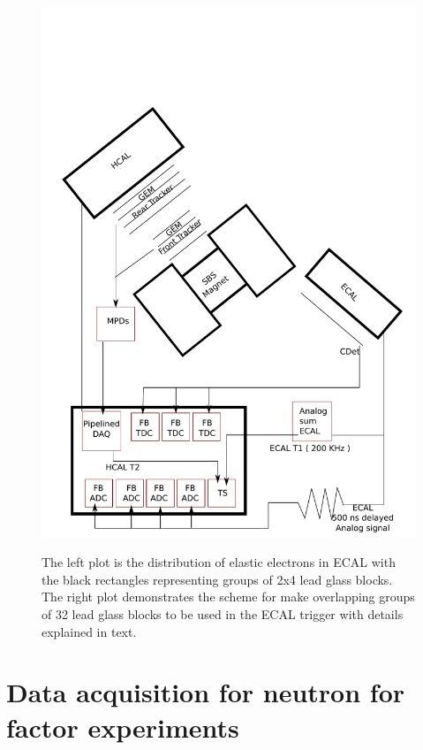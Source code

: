\documentclass{article}
\begin{document}
\begin{figure}
  \centering
  \includegraphics[width=\textwidth]{figs/Gep5layout.pdf}\\
  \caption{The left plot is the distribution of elastic electrons in ECAL with the black rectangles representing
groups of 2x4 lead glass blocks. The right plot demonstrates
the scheme for make overlapping groups of 32 lead glass blocks to be used in the ECAL trigger with
details explained in text.  }\label{fig:ECALTrig}
\end{figure}



\section{Data acquisition for neutron for factor experiments}
\end{document}
